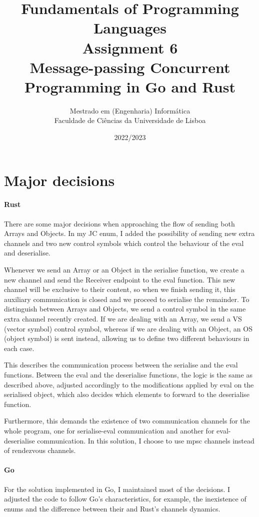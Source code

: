 \documentclass[a4paper]{article}
\title{
  \color{blue}Fundamentals of Programming Languages\\[1ex]
  Assignment 6\\[1ex]
  Message-passing Concurrent Programming in Go and Rust}
\author{Mestrado em (Engenharia) Informática\\
  Faculdade de Ciências da Universidade de Lisboa
}
\date{2022/2023}
\begin{document}
\maketitle
\setlength{\parskip}{1ex}
\thispagestyle{empty}

\section*{Major decisions}
\paragraph*{Rust}
There are some major decisions when approaching the flow of sending both Arrays and Objects. In my JC enum, I added the possibility of sending new extra channels and two new control symbols which control the behaviour of the eval and deserialise. 

Whenever we send an Array or an Object in the serialise function, we create a new channel and send the Receiver endpoint to the eval function. This new channel will be exclusive to their content, so when we finish sending it, this auxiliary communication is closed and we proceed to serialise the remainder. To distinguish between Arrays and Objects, we send a control symbol in the same extra channel recently created. If we are dealing with an Array, we send a VS (vector symbol) control symbol, whereas if we are dealing with an Object, an OS (object symbol) is sent instead, allowing us to define two different behaviours in each case.

This describes the communication process between the serialise and the eval functions. Between the eval and the deserialise functions, the logic is the same as described above, adjusted accordingly to the modifications applied by eval on the serialised object, which also decides which elements to forward to the deserialise function.

Furthermore, this demands the existence of two communication channels for the whole program, one for serialise-eval communication and another for eval-deserialise communication.
In this solution, I choose to use mpsc channels instead of rendezvous channels.
\paragraph*{Go}
For the solution implemented in Go, I maintained most of the decisions. I adjusted the code to follow Go's characteristics, for example, the inexistence of enums and the difference between their and Rust's channels dynamics.
\end{document}
